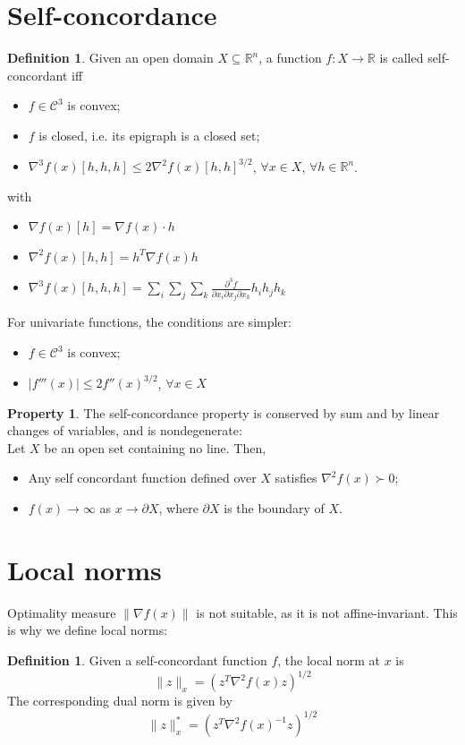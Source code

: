 \documentclass[12pt, openany]{report}
\newcommand{\R}{\mathbb{R}}
\theoremstyle{definition}
\newtheorem{definition}[thm]{Definition}
\newtheorem{prop}[thm]{Property}
\begin{document}
\section{Self-concordance}
\begin{definition}
    Given an open domain $X\subseteq \R^n$, a function $f:X\rightarrow \R$ is called self-concordant iff 
    \begin{itemize}
        \item $f\in \mathcal{C}^3$ is convex;
        \item $f$ is closed, i.e. its epigraph is a closed set;
        \item $\nabla^3f(x)[h,h,h]\le 2\nabla^2 f(x)[h,h]^{3/2}$, $\forall x\in X$, $\forall h\in \R^n$.
    \end{itemize}
    with 
    \begin{itemize}
        \item $\nabla f(x)[h] = \nabla f(x) \cdot h$
        \item $\nabla^2f(x)[h,h] = h^T\nabla f(x)h$
        \item $\nabla^3f(x)[h,h,h] = \sum_i\sum_j\sum_k \frac{\partial^3 f}{\partial x_i \partial x_j \partial x_k}h_ih_jh_k$
    \end{itemize}
\end{definition}
For univariate functions, the conditions are simpler:
\begin{itemize}
    \item $f\in \mathcal{C}^3$ is convex;
    \item $|f'''(x)|\le 2f''(x)^{3/2}$, $\forall x \in X$
\end{itemize}
\begin{prop}
    The self-concordance property is conserved by sum and by linear changes of variables, and is nondegenerate:\\
    Let $X$ be an open set containing no line. Then,
    \begin{itemize}
        \item Any self concordant function defined over $X$ satisfies $\nabla^2f(x)\succ 0$;
        \item $f(x)\rightarrow \infty$ as $x\rightarrow \partial X$, where $\partial X$ is the boundary of $X$.
    \end{itemize}
\end{prop}
\section{Local norms}
Optimality measure $\lVert \nabla f(x)\rVert$ is not suitable, as it is not affine-invariant. This is why we define local norms:
\begin{definition}
    Given a self-concordant function $f$, the local norm at $x$ is 
    \begin{equation}
        \lVert z\rVert_x = (z^T\nabla^2f(x)z)^{1/2}
    \end{equation}
    The corresponding dual norm is given by
    \begin{equation}
        \lVert z\rVert_x^* = (z^T\nabla^2f(x)^{-1}z)^{1/2}
    \end{equation}
\end{definition}
\end{document}
